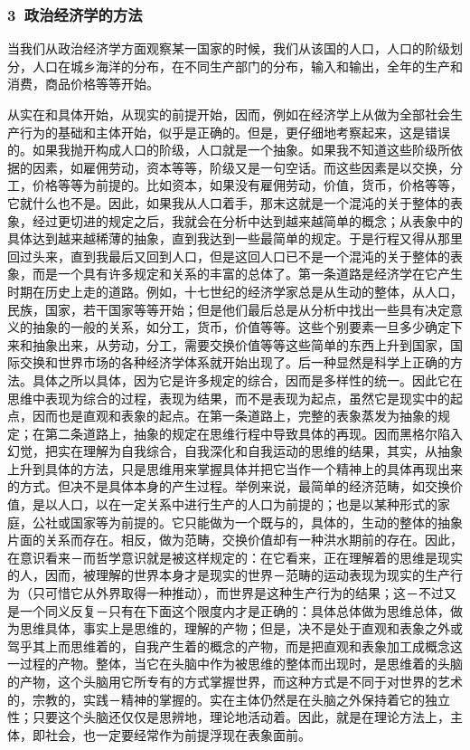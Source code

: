 \documentclass[a4paper,twoside,12pt]{ctexart}
\begin{document}
\subsubsection{3~政治经济学的方法}

当我们从政治经济学方面观察某一国家的时候，我们从该国的人口，人口的阶级划分，人口在城乡海洋的分布，在不同生产部门的分布，输入和输出，全年的生产和消费，商品价格等等开始。

从实在和具体开始，从现实的前提开始，因而，例如在经济学上从做为全部社会生产行为的基础和主体开始，似乎是正确的。但是，更仔细地考察起来，这是错误的。如果我抛开构成人口的阶级，人口就是一个抽象。如果我不知道这些阶级所依据的因素，如雇佣劳动，资本等等，阶级又是一句空话。而这些因素是以交换，分工，价格等等为前提的。比如资本，如果没有雇佣劳动，价值，货币，价格等等，它就什么也不是。因此，如果我从人口着手，那末这就是一个混沌的关于整体的表象，经过更切进的规定之后，我就会在分析中达到越来越简单的概念；从表象中的具体达到越来越稀薄的抽象，直到我达到一些最简单的规定。于是行程又得从那里回过头来，直到我最后又回到人口，但是这回人口已不是一个混沌的关于整体的表象，而是一个具有许多规定和关系的丰富的总体了。第一条道路是经济学在它产生时期在历史上走的道路。例如，十七世纪的经济学家总是从生动的整体，从人口，民族，国家，若干国家等等开始；但是他们最后总是从分析中找出一些具有决定意义的抽象的一般的关系，如分工，货币，价值等等。这些个别要素一旦多少确定下来和抽象出来，从劳动，分工，需要交换价值等等这些简单的东西上升到国家，国际交换和世界市场的各种经济学体系就开始出现了。后一种显然是科学上正确的方法。具体之所以具体，因为它是许多规定的综合，因而是多样性的统一。因此它在思维中表现为综合的过程，表现为结果，而不是表现为起点，虽然它是现实中的起点，因而也是直观和表象的起点。在第一条道路上，完整的表象蒸发为抽象的规定；在第二条道路上，抽象的规定在思维行程中导致具体的再现。因而黑格尔陷入幻觉，把实在理解为自我综合，自我深化和自我运动的思维的结果，其实，从抽象上升到具体的方法，只是思维用来掌握具体并把它当作一个精神上的具体再现出来的方式。但决不是具体本身的产生过程。举例来说，最简单的经济范畴，如交换价值，是以人口，以在一定关系中进行生产的人口为前提的；也是以某种形式的家庭，公社或国家等为前提的。它只能做为一个既与的，具体的，生动的整体的抽象片面的关系而存在。相反，做为范畴，交换价值却有一种洪水期前的存在。因此，在意识看来－而哲学意识就是被这样规定的：在它看来，正在理解着的思维是现实的人，因而，被理解的世界本身才是现实的世界－范畴的运动表现为现实的生产行为（只可惜它从外界取得一种推动），而世界是这种生产行为的结果；这－不过又是一个同义反复－只有在下面这个限度内才是正确的：具体总体做为思维总体，做为思维具体，事实上是思维的，理解的产物；但是，决不是处于直观和表象之外或驾乎其上而思维着的，自我产生着的概念的产物，而是把直观和表象加工成概念这一过程的产物。整体，当它在头脑中作为被思维的整体而出现时，是思维着的头脑的产物，这个头脑用它所专有的方式掌握世界，而这种方式是不同于对世界的艺术的，宗教的，实践－精神的掌握的。实在主体仍然是在头脑之外保持着它的独立性；只要这个头脑还仅仅是思辨地，理论地活动着。因此，就是在理论方法上，主体，即社会，也一定要经常作为前提浮现在表象面前。
\end{document}

